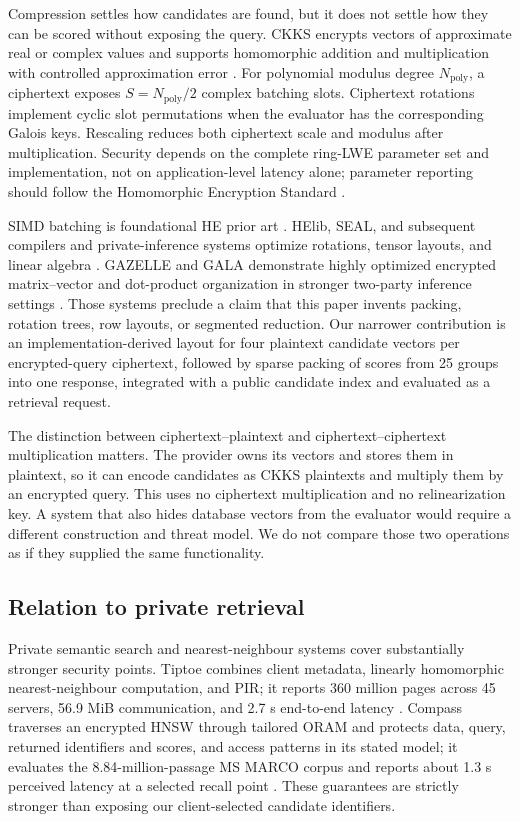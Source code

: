 \documentclass[pdflatex,sn-basic,Numbered]{sn-jnl}
\theoremstyle{plain}
\begin{document}
Compression settles how candidates are found, but it does not settle how they can be scored without exposing the query. CKKS encrypts vectors of approximate real or complex values and supports homomorphic addition and multiplication with controlled approximation error \cite{Cheon2017CKKS}. For polynomial modulus degree $N_{\mathrm{poly}}$, a ciphertext exposes $S=N_{\mathrm{poly}}/2$ complex batching slots. Ciphertext rotations implement cyclic slot permutations when the evaluator has the corresponding Galois keys. Rescaling reduces both ciphertext scale and modulus after multiplication. Security depends on the complete ring-LWE parameter set and implementation, not on application-level latency alone; parameter reporting should follow the Homomorphic Encryption Standard \cite{Albrecht2018HEStandard}.

SIMD batching is foundational HE prior art \cite{Smart2014SIMD}. HElib, SEAL, and subsequent compilers and private-inference systems optimize rotations, tensor layouts, and linear algebra \cite{Halevi2014HElib,Microsoft2023SEAL,Dathathri2019CHET,Dathathri2020EVA}. GAZELLE and GALA demonstrate highly optimized encrypted matrix--vector and dot-product organization in stronger two-party inference settings \cite{Juvekar2018Gazelle,Zhang2021GALA}. Those systems preclude a claim that this paper invents packing, rotation trees, row layouts, or segmented reduction. Our narrower contribution is an implementation-derived layout for four plaintext candidate vectors per encrypted-query ciphertext, followed by sparse packing of scores from 25 groups into one response, integrated with a public candidate index and evaluated as a retrieval request.

The distinction between ciphertext--plaintext and ciphertext--ciphertext multiplication matters. The provider owns its vectors and stores them in plaintext, so it can encode candidates as CKKS plaintexts and multiply them by an encrypted query. This uses no ciphertext multiplication and no relinearization key. A system that also hides database vectors from the evaluator would require a different construction and threat model. We do not compare those two operations as if they supplied the same functionality.

\subsection{Relation to private retrieval}\label{subsec:private-retrieval}

Private semantic search and nearest-neighbour systems cover substantially stronger security points. Tiptoe combines client metadata, linearly homomorphic nearest-neighbour computation, and PIR; it reports 360 million pages across 45 servers, 56.9 MiB communication, and 2.7 s end-to-end latency \cite{Henzinger2023Tiptoe}. Compass traverses an encrypted HNSW through tailored ORAM and protects data, query, returned identifiers and scores, and access patterns in its stated model; it evaluates the 8.84-million-passage MS MARCO corpus and reports about 1.3 s perceived latency at a selected recall point \cite{Zhu2025Compass}. These guarantees are strictly stronger than exposing our client-selected candidate identifiers.
\end{document}
